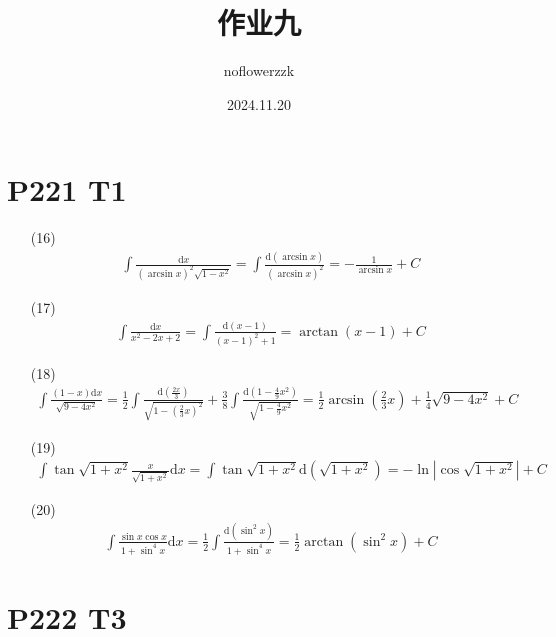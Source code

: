 \documentclass{article}
\title{作业九}
\author{noflowerzzk}
\date{2024.11.20}
\newcommand{\dd}{\mathrm{d}}
\newcommand{\dx}{\dd x}
\begin{document}
\maketitle

\section*{P221 T1}

\begin{itemize}
    \item [(16)]
    \begin{align*}
        \int \frac{\dx}{\left(\arcsin x\right)^2 \sqrt{1 - x^2}} = \int \frac{\dd \left(\arcsin x\right)}{\left(\arcsin x\right)^2} = -\frac{1}{\arcsin x} + C
    \end{align*}
    \item [(17)]
    \begin{align*}
        \int \frac{\dx}{x^2 - 2x + 2} = \int \frac{\dd (x - 1)}{(x - 1)^2 + 1} = \arctan (x - 1) + C
    \end{align*}
    \item [(18)]
    \begin{align*}
        \int \frac{(1 - x)\dx}{\sqrt{9 - 4x^2}} = \frac{1}{2}\int \frac{\dd(\frac{2x}{3})}{\sqrt{1 - \left(\frac{2}{3}x\right)^2}} + \frac{3}{8}\int \frac{\dd \left(1 - \frac{4}{9}x^2\right)}{\sqrt{1 - \frac{4}{9}x^2}} = \frac{1}{2}\arcsin \left(\frac{2}{3}x\right) + \frac{1}{4}\sqrt{9 - 4x^2} + C
    \end{align*}
    \item [(19)]
    \begin{align*}
        \int \tan \sqrt{1 + x^2}\frac{x}{\sqrt{1 + x^2}}\dx = \int \tan \sqrt{1 + x^2} \dd(\sqrt{1 + x^2}) = - \ln \left\lvert \cos \sqrt{1 + x^2}\right\rvert + C
    \end{align*}
    \item [(20)]
    \begin{align*}
        \int \frac{\sin x \cos x }{1 + \sin^4 x}\dx = \frac{1}{2}\int \frac{\dd (\sin^2 x)}{1 + \sin^4 x} = \frac{1}{2}\arctan\left(\sin^2 x\right) + C
    \end{align*}
\end{itemize}

\section*{P222 T3}
\end{document}
